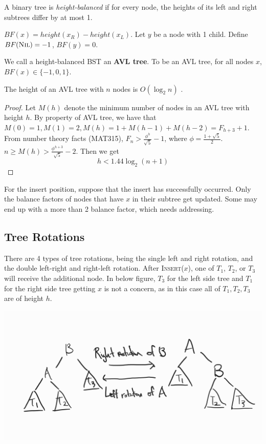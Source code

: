 \begin{definition}
A binary tree is \textit{height-balanced} if for every node, the heights of its left and right subtrees differ by at most 1.
\end{definition}

\begin{definition}
    $BF(x) = height(x_R) - height(x_L)$. Let $y$ be a node with 1 child. Define $BF(\textsc{Nil}) = -1$, $BF(y) = 0$.
\end{definition}

We call a height-balanced BST an \textbf{AVL tree}. To be an AVL tree, for all nodes $x$, $BF(x) \in \{ -1, 0, 1 \}$.

\begin{simplethm}
    The height of an AVL tree with $n$ nodes is $O(\log_2 n)$ .
\end{simplethm}
\begin{proof}
    Let $M(h)$ denote the minimum number of nodes in an AVL tree with height $h$. By property of AVL tree, we have that $M(0) = 1, M(1) = 2, M(h) = 1 + M(h - 1) + M(h - 2) = F_{h + 3} + 1$. From number theory facts (MAT315), $F_n > \frac{\phi^h}{\sqrt{5}} - 1$, where $\phi = \frac{1 + \sqrt{5}}{2}$. $n \geq M(h) > \frac{\phi^{h+3}}{\sqrt{5}} - 2$. Then we get
    \[
    h < 1.44 \log_2 (n + 1) 
    \]
\end{proof}

For the insert position, suppose that the insert has successfully occurred. Only the balance factors of nodes that have $x$ in their subtree get updated. Some may end up with a more than 2 balance factor, which needs addressing.

\subsection{Tree Rotations}

There are 4 types of tree rotations, being the single left and right rotation, and the double left-right and right-left rotation. After \textsc{Insert}($x$), one of $T_1$, $T_2$, or $T_3$ will receive the additional node. In below figure, $T_3$ for the left side tree and $T_1$ for the right side tree getting $x$ is not a concern, as in this case all of $T_1, T_2, T_3$ are of height $h$. 

\includegraphics{csc265/figures/avlleftandrightrotation.jpg}


